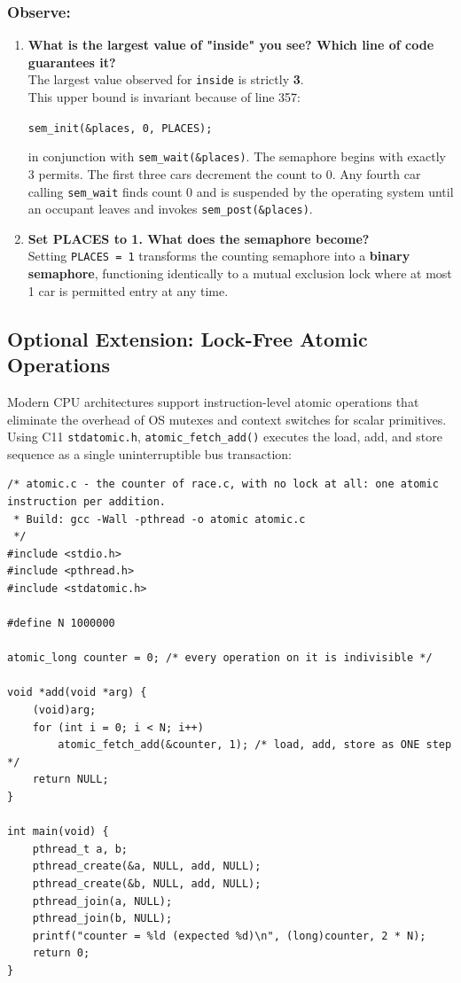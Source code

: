 \documentclass{labreport}
\begin{document}
\subsubsection*{Observe:}
\begin{enumerate}[leftmargin=*]
    \item \textbf{What is the largest value of "inside" you see? Which line of code guarantees it?}\\[0.2em]
    The largest value observed for \texttt{inside} is strictly \textbf{3}.\\
    This upper bound is invariant because of line 357:
    \begin{center}
        \texttt{sem\_init(\&places, 0, PLACES);}
    \end{center}
    in conjunction with \texttt{sem\_wait(\&places)}. The semaphore begins with exactly 3 permits. The first three cars decrement the count to 0. Any fourth car calling \texttt{sem\_wait} finds count 0 and is suspended by the operating system until an occupant leaves and invokes \texttt{sem\_post(\&places)}.

    \item \textbf{Set PLACES to 1. What does the semaphore become?}\\[0.2em]
    Setting \texttt{PLACES = 1} transforms the counting semaphore into a \textbf{binary semaphore}, functioning identically to a mutual exclusion lock where at most 1 car is permitted entry at any time.
\end{enumerate}

\subsection{Optional Extension: Lock-Free Atomic Operations}

Modern CPU architectures support instruction-level atomic operations that eliminate the overhead of OS mutexes and context switches for scalar primitives. Using C11 \texttt{stdatomic.h}, \texttt{atomic\_fetch\_add()} executes the load, add, and store sequence as a single uninterruptible bus transaction:

\begin{lstlisting}[style=c]
/* atomic.c - the counter of race.c, with no lock at all: one atomic instruction per addition.
 * Build: gcc -Wall -pthread -o atomic atomic.c
 */
#include <stdio.h>
#include <pthread.h>
#include <stdatomic.h>

#define N 1000000

atomic_long counter = 0; /* every operation on it is indivisible */

void *add(void *arg) {
    (void)arg;
    for (int i = 0; i < N; i++)
        atomic_fetch_add(&counter, 1); /* load, add, store as ONE step */
    return NULL;
}

int main(void) {
    pthread_t a, b;
    pthread_create(&a, NULL, add, NULL);
    pthread_create(&b, NULL, add, NULL);
    pthread_join(a, NULL);
    pthread_join(b, NULL);
    printf("counter = %ld (expected %d)\n", (long)counter, 2 * N);
    return 0;
}
\end{lstlisting}
\end{document}
